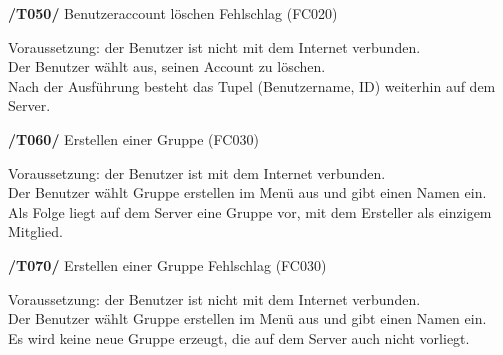 \textbf{/T050/} Benutzeraccount löschen Fehlschlag (FC020) \\
\begin{itemize}
Voraussetzung: der Benutzer ist nicht mit dem Internet verbunden.            \\
Der Benutzer wählt aus, seinen Account zu löschen.                            \\
Nach der Ausführung besteht das Tupel (Benutzername, ID) weiterhin auf dem Server.\\
\end{itemize}

\textbf{/T060/} Erstellen einer Gruppe (FC030)\\
\begin{itemize}
Voraussetzung: der Benutzer ist mit dem Internet verbunden.                        \\
Der Benutzer wählt Gruppe erstellen im Menü aus und gibt einen Namen ein.           \\
Als Folge liegt auf dem Server eine Gruppe vor, mit dem Ersteller als einzigem Mitglied.\\
\end{itemize}

\textbf{/T070/} Erstellen einer Gruppe Fehlschlag (FC030)\\
\begin{itemize}
Voraussetzung: der Benutzer ist nicht mit dem Internet verbunden.              \\
Der Benutzer wählt Gruppe erstellen im Menü aus und gibt einen Namen ein.       \\
Es wird keine neue Gruppe erzeugt, die auf dem Server auch nicht vorliegt.       \\
\end{itemize}

